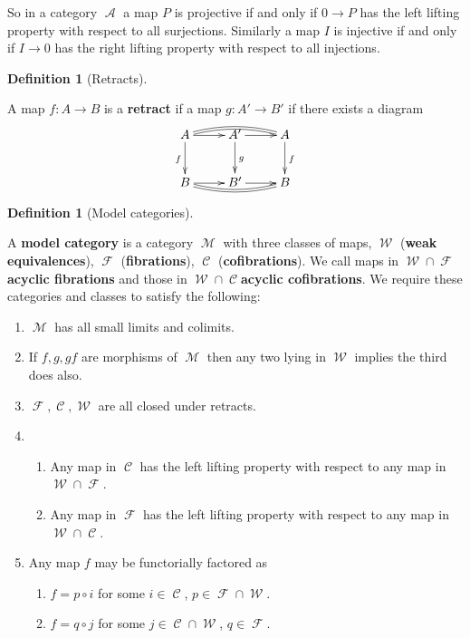 \documentclass[10pt,]{book}
\newcommand{\terminology}[1]{\textbf{#1}}
\theoremstyle{plain}
\theoremstyle{definition}
\newtheorem{definition}[theorem]{Definition}
\numberwithin{equation}{section}
\DeclareMathOperator{\cA}{\mathcal{A}}
\DeclareMathOperator{\cM}{\mathcal{M}}
\DeclareMathOperator{\sC}{\mathscr{C}}
\DeclareMathOperator{\sF}{\mathscr{F}}
\DeclareMathOperator{\sW}{\mathscr{W}}
\begin{document}
          So in a category \(\cA\) a map \(P\) is projective if and only if \(0\to P\) has the left lifting property with respect to all surjections.
          Similarly a map \(I\) is injective if and only if \(I\to 0\) has the right lifting property with respect to all injections.
\begin{definition}[Retracts]\label{definition-30}

            A map \(f\colon A \to B\) is a \terminology{retract} if a map \(g\colon A' \to B'\) if there exists a diagram
            \[
              \xymatrix{
                A \ar@{=}@/^/[rr] \ar[r]\ar[d]_f &A' \ar[r] \ar[d]^g &A\ar[d]^f \\
                B \ar@{=}@/_/[rr] \ar[r] & B'\ar[r] & B
              }
            \]\end{definition}
\begin{definition}[Model categories]\label{definition-31}

            A \terminology{model category} is a category \(\cM\) with three classes of maps, \(\sW\) (\terminology{weak equivalences}), \(\sF\) (\terminology{fibrations}), \(\sC\) (\terminology{cofibrations}).
            We call maps in \(\sW \cap \sF\)\terminology{acyclic fibrations} and those in \(\sW \cap \sC\)\terminology{acyclic cofibrations}.
            We require these categories and classes to satisfy the following:
            \begin{enumerate}
\item{}\(\cM\) has all small limits and colimits.\item{}If \(f,g,gf\) are morphisms of \(\cM\) then any two lying in \(\sW\) implies the third does also.\item{}\(\sF,\sC,\sW\) are all closed under retracts.\item{}
                \begin{enumerate}
\item{}Any map in \(\sC\) has the left lifting property with respect to any map in \(\sW\cap\sF\).\item{}Any map in \(\sF\) has the left lifting property with respect to any map in \(\sW\cap\sC\).\end{enumerate}

              \item{}
                Any map \(f\) may be functorially factored as
                \begin{enumerate}
\item{}\(f = p \circ i\) for some \(i\in \sC\), \(p\in \sF \cap \sW\).\item{}\(f = q \circ j\) for some \(j\in \sC\cap \sW\), \(q\in \sF\).\end{enumerate}

              \end{enumerate}
\end{definition}
\end{document}
